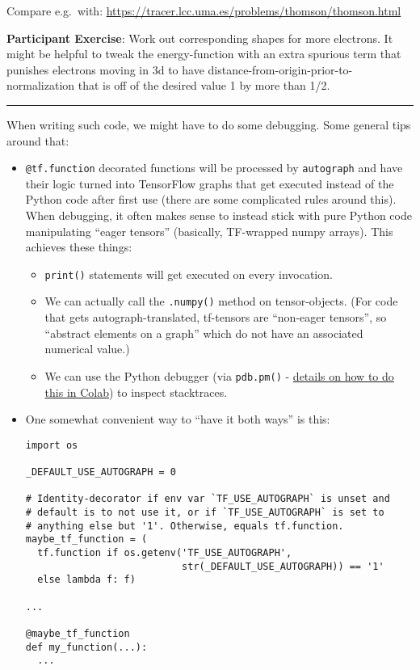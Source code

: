 \documentclass[11pt]{article}
\providecommand{\tightlist}{%
      \setlength{\itemsep}{0pt}\setlength{\parskip}{0pt}}
\begin{document}
Compare e.g.~with:
\url{https://tracer.lcc.uma.es/problems/thomson/thomson.html}

\textbf{Participant Exercise}: Work out corresponding shapes for more
electrons. It might be helpful to tweak the energy-function with an
extra spurious term that punishes electrons moving in 3d to have
distance-from-origin-prior-to-normalization that is off of the desired
value 1 by more than 1/2.

\begin{center}\rule{0.5\linewidth}{0.5pt}\end{center}

    When writing such code, we might have to do some debugging. Some general
tips around that:

\begin{itemize}
\item
  \texttt{@tf.function} decorated functions will be processed by
  \texttt{autograph} and have their logic turned into TensorFlow graphs
  that get executed instead of the Python code after first use (there
  are some complicated rules around this). When debugging, it often
  makes sense to instead stick with pure Python code manipulating
  ``eager tensors'' (basically, TF-wrapped numpy arrays). This achieves
  these things:

  \begin{itemize}
  \tightlist
  \item
    \texttt{print()} statements will get executed on every invocation.
  \item
    We can actually call the \texttt{.numpy()} method on tensor-objects.
    (For code that gets autograph-translated, tf-tensors are ``non-eager
    tensors'', so ``abstract elements on a graph'' which do not have an
    associated numerical value.)
  \item
    We can use the Python debugger (via \texttt{pdb.pm()} -
    \href{https://colab.research.google.com/github/jakevdp/PythonDataScienceHandbook/blob/master/notebooks/01.06-Errors-and-Debugging.ipynb}{details
    on how to do this in Colab}) to inspect stacktraces.
  \end{itemize}
\item
  One somewhat convenient way to ``have it both ways'' is this:

\begin{verbatim}
import os

_DEFAULT_USE_AUTOGRAPH = 0

# Identity-decorator if env var `TF_USE_AUTOGRAPH` is unset and
# default is to not use it, or if `TF_USE_AUTOGRAPH` is set to
# anything else but '1'. Otherwise, equals tf.function.
maybe_tf_function = (
  tf.function if os.getenv('TF_USE_AUTOGRAPH',
                           str(_DEFAULT_USE_AUTOGRAPH)) == '1'
  else lambda f: f)

...

@maybe_tf_function
def my_function(...):
  ...
\end{verbatim}
\end{itemize}
\end{document}

